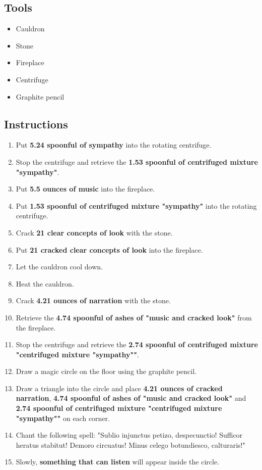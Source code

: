 \documentclass{article}
\begin{document}
\subsection{Tools}\begin{itemize}
\item 
Cauldron
\item 
Stone
\item 
Fireplace
\item 
Centrifuge
\item 
Graphite pencil
\end{itemize}
\subsection{Instructions}\begin{enumerate}
\item 
Put \textbf{5.24 spoonful of sympathy} into the rotating centrifuge.
\item 
Stop the centrifuge and retrieve the \textbf{1.53 spoonful of centrifuged mixture "sympathy"}.
\item 
Put \textbf{5.5 ounces of music} into the fireplace.
\item 
Put \textbf{1.53 spoonful of centrifuged mixture "sympathy"} into the rotating centrifuge.
\item 
Crack \textbf{21 clear concepts of look} with the stone.
\item 
Put \textbf{21 cracked clear concepts of look} into the fireplace.
\item 
Let the cauldron cool down.
\item 
Heat the cauldron.
\item 
Crack \textbf{4.21 ounces of narration} with the stone.
\item 
Retrieve the \textbf{4.74 spoonful of ashes of "music and cracked look"} from the fireplace.
\item 
Stop the centrifuge and retrieve the \textbf{2.74 spoonful of centrifuged mixture "centrifuged mixture "sympathy""}.
\item 
Draw a magic circle on the floor using the graphite pencil.
\item 
Draw a triangle into the circle and place \textbf{4.21 ounces of cracked narration}, \textbf{4.74 spoonful of ashes of "music and cracked look"} and \textbf{2.74 spoonful of centrifuged mixture "centrifuged mixture "sympathy""} on each corner.
\item 
Chant the following spell: "Sublio injunctus petizo, despecunctio! Sufficor heratus stabitut! Demoro circuatus! Minus celego botundiesco, calturaris!"
\item 
Slowly, \textbf{something that can listen} will appear inside the circle.
\end{enumerate}
\newpage
\end{document}
